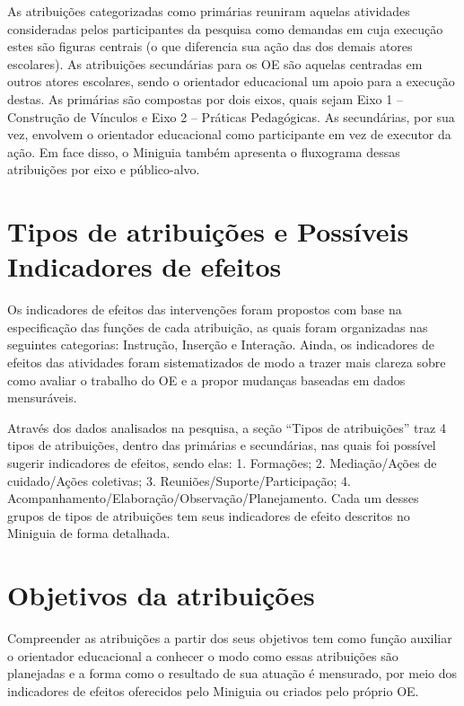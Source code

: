 \documentclass[
  letterpaper,
  DIV=11,
  numbers=noendperiod,
  oneside]{scrreprt}
\begin{document}
As atribuições categorizadas como primárias reuniram aquelas atividades
consideradas pelos participantes da pesquisa como demandas em cuja
execução estes são figuras centrais (o que diferencia sua ação das dos
demais atores escolares). As atribuições secundárias para os OE são
aquelas centradas em outros atores escolares, sendo o orientador
educacional um apoio para a execução destas. As primárias são compostas
por dois eixos, quais sejam Eixo 1 -- Construção de Vínculos e Eixo 2 --
Práticas Pedagógicas. As secundárias, por sua vez, envolvem o orientador
educacional como participante em vez de executor da ação. Em face disso,
o Miniguia também apresenta o fluxograma dessas atribuições por eixo e
público-alvo.

\hypertarget{tipos-de-atribuiuxe7uxf5es-e-possuxedveis-indicadores-de-efeitos}{%
\section{Tipos de atribuições e Possíveis Indicadores de
efeitos}\label{tipos-de-atribuiuxe7uxf5es-e-possuxedveis-indicadores-de-efeitos}}

Os indicadores de efeitos das intervenções foram propostos com base na
especificação das funções de cada atribuição, as quais foram organizadas
nas seguintes categorias: Instrução, Inserção e Interação. Ainda, os
indicadores de efeitos das atividades foram sistematizados de modo a
trazer mais clareza sobre como avaliar o trabalho do OE e a propor
mudanças baseadas em dados mensuráveis.

Através dos dados analisados na pesquisa, a seção ``Tipos de
atribuições'' traz 4 tipos de atribuições, dentro das primárias e
secundárias, nas quais foi possível sugerir indicadores de efeitos,
sendo elas: 1. Formações; 2. Mediação/Ações de cuidado/Ações coletivas;
3. Reuniões/Suporte/Participação; 4.
Acompanhamento/Elaboração/Observação/Planejamento. Cada um desses grupos
de tipos de atribuições tem seus indicadores de efeito descritos no
Miniguia de forma detalhada.

\hypertarget{objetivos-da-atribuiuxe7uxf5es}{%
\section{Objetivos da
atribuições}\label{objetivos-da-atribuiuxe7uxf5es}}

Compreender as atribuições a partir dos seus objetivos tem como função
auxiliar o orientador educacional a conhecer o modo como essas
atribuições são planejadas e a forma como o resultado de sua atuação é
mensurado, por meio dos indicadores de efeitos oferecidos pelo Miniguia
ou criados pelo próprio OE.
\end{document}
